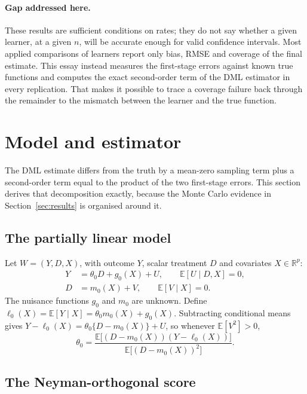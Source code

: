 \documentclass[11pt,a4paper]{article}
\newcommand{\E}{\mathbb{E}}
\begin{document}
\paragraph{Gap addressed here.} These results are sufficient conditions on rates; they do not say whether a given learner, at a given $n$, will be accurate enough for valid confidence intervals. Most applied comparisons of learners report only bias, RMSE and coverage of the final estimate. This essay instead measures the first-stage errors against known true functions and computes the exact second-order term of the DML estimator in every replication. That makes it possible to trace a coverage failure back through the remainder to the mismatch between the learner and the true function.

\section{Model and estimator}\label{sec:model}

The DML estimate differs from the truth by a mean-zero sampling term plus a second-order term equal to the product of the two first-stage errors. This section derives that decomposition exactly, because the Monte Carlo evidence in Section~\ref{sec:results} is organised around it.

\subsection{The partially linear model}

Let $W=(Y,D,X)$, with outcome $Y$, scalar treatment $D$ and covariates $X\in\mathbb{R}^p$:
\begin{align}
Y &= \theta_0 D + g_0(X) + U, \qquad \E[U\mid D,X]=0, \label{eq:y}\\
D &= m_0(X) + V, \qquad \E[V\mid X]=0. \label{eq:d}
\end{align}
The nuisance functions $g_0$ and $m_0$ are unknown. Define $\ell_0(X)=\E[Y\mid X]=\theta_0 m_0(X)+g_0(X)$. Subtracting conditional means gives $Y-\ell_0(X)=\theta_0\{D-m_0(X)\}+U$, so whenever $\E[V^2]>0$,
\[
\theta_0=\frac{\E\big[(D-m_0(X))(Y-\ell_0(X))\big]}{\E\big[(D-m_0(X))^2\big]}.
\]

\subsection{The Neyman-orthogonal score}
\end{document}

